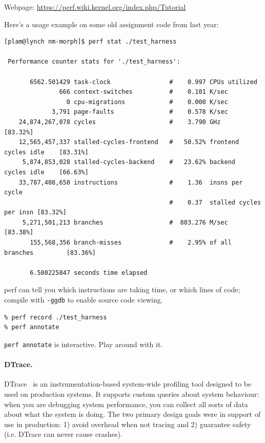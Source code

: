 \documentclass[a4paper]{report}
\begin{document}
Webpage: \url{https://perf.wiki.kernel.org/index.php/Tutorial}

\noindent
Here's a usage example on some old assignment code from last year:
\begin{lstlisting}[basicstyle=\scriptsize]
[plam@lynch nm-morph]$ perf stat ./test_harness

 Performance counter stats for './test_harness':

       6562.501429 task-clock                #    0.997 CPUs utilized          
               666 context-switches          #    0.101 K/sec                  
                 0 cpu-migrations            #    0.000 K/sec                  
             3,791 page-faults               #    0.578 K/sec                  
    24,874,267,078 cycles                    #    3.790 GHz                     [83.32%]
    12,565,457,337 stalled-cycles-frontend   #   50.52% frontend cycles idle    [83.31%]
     5,874,853,028 stalled-cycles-backend    #   23.62% backend  cycles idle    [66.63%]
    33,787,408,650 instructions              #    1.36  insns per cycle        
                                             #    0.37  stalled cycles per insn [83.32%]
     5,271,501,213 branches                  #  803.276 M/sec                   [83.38%]
       155,568,356 branch-misses             #    2.95% of all branches         [83.36%]

       6.580225847 seconds time elapsed
\end{lstlisting} %

\noindent
perf can tell you which instructions are taking time, or which lines
of code; compile with {\tt -ggdb} to enable source code viewing.

\begin{lstlisting}
% perf record ./test_harness
% perf annotate
\end{lstlisting}

\noindent
{\tt perf annotate} is interactive. Play around with it.

\paragraph{DTrace.} 
DTrace~\cite{Cantrill:2004:DIP:1247415.1247417} is an instrumentation-based
system-wide profiling tool designed to be used on production
systems. It supports custom queries about system behaviour: when you
are debugging system performance, you can collect all sorts of data
about what the system is doing. The two primary design goals were in
support of use in production: 1) avoid overhead when not tracing and
2) guarantee safety (i.e. DTrace can never cause crashes).
\end{document}
